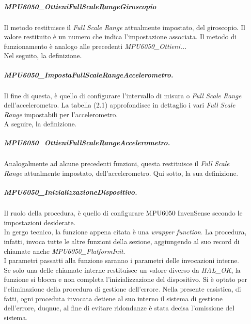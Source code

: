 \documentclass[11pt]{report}
\begin{document}
\subparagraph{MPU6050\_OttieniFullScaleRangeGiroscopio}
Il metodo restituisce il \textit{Full Scale Range} attualmente impostato, del giroscopio. Il valore restituito è un numero che indica l'impostazione associata. Il metodo di funzionamento è analogo alle precedenti \textit{MPU6050\_Ottieni...}\\
Nel seguito, la definizione.


\subparagraph{MPU6050\_ImpostaFullScaleRangeAccelerometro.}
Il fine di questa, è quello di configurare l'intervallo di misura o \textit{Full Scale Range} dell'accelerometro. La tabella (2.1) approfondisce in dettaglio i vari \textit{Full Scale Range} impostabili per l'accelerometro.\\
A seguire, la definizione.


\subparagraph{MPU6050\_OttieniFullScaleRangeAccelerometro.}
Analogalmente ad alcune precedenti funzioni, questa restituisce il \textit{Full Scale Range} attualmente impostato, dell'accelerometro.
Qui sotto, la sua definizione.


\subparagraph{MPU6050\_InizializzazioneDispositivo.}
Il ruolo della procedura, è quello di configurare MPU6050 InvenSense secondo le impostazioni desiderate.\\
In gergo tecnico, la funzione appena citata è una \textit{wrapper function}. La procedura, infatti, invoca tutte le altre funzioni della sezione, aggiungendo al suo record di chiamate anche \textit{MPU6050\_PlatformInit}.\\
I parametri passatti alla funzione saranno i parametri delle invocazioni interne.\\
Se solo una delle chiamate interne restituisce un valore diverso da \textit{HAL\_OK}, la funzione si blocca e non completa l'inizializzazione del dispositivo.
Si è optato per l'eliminazione della procedura di gestione dell'errore. Nella presente casistica, di fatti, ogni proceduta invocata detiene al suo interno il sistema di gestione dell'errore, duqnue, al fine di evitare ridondanze è stata decisa l'omissione del sistema.
\newpage

\end{document}

